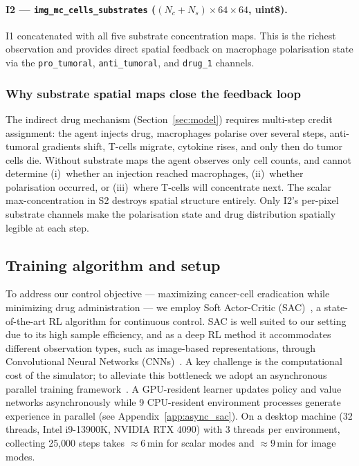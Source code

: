 \documentclass{article}
\newcommand{\Itwo}{\texttt{img\_mc\_cells\_substrates}}
\begin{document}
\paragraph{I2 — \Itwo{} ($(N_c\!+\!N_s)\!\times\!64\!\times\!64$, uint8).}
I1 concatenated with all five substrate concentration maps.
This is the richest observation and provides direct spatial feedback on
macrophage polarisation state via the \texttt{pro\_tumoral},
\texttt{anti\_tumoral}, and \texttt{drug\_1} channels.

\subsubsection*{Why substrate spatial maps close the feedback loop}

The indirect drug mechanism (Section~\ref{sec:model}) requires multi-step
credit assignment: the agent injects drug, macrophages polarise over several
steps, anti-tumoral gradients shift, T-cells migrate, cytokine rises, and
only then do tumor cells die.
Without substrate maps the agent observes only cell counts, and cannot
determine (i)~whether an injection reached macrophages, (ii)~whether
polarisation occurred, or (iii)~where T-cells will concentrate next.
The scalar max-concentration in S2 destroys spatial structure entirely.
Only I2's per-pixel substrate channels make the polarisation state and drug
distribution spatially legible at each step.

\subsection{Training algorithm and setup}
\label{sec:training}

To address our control objective — maximizing cancer-cell eradication while
minimizing drug administration — we employ Soft Actor-Critic
(SAC)~\citep{haarnoja2018soft}, a state-of-the-art RL algorithm for continuous
control. SAC is well suited to our setting due to its high sample efficiency,
and as a deep RL method it accommodates different observation types, such as
image-based representations, through Convolutional Neural Networks
(CNNs)~\citep{o2015introduction}. A key challenge is the computational cost of
the simulator; to alleviate this bottleneck we adopt an asynchronous parallel
training framework~\citep{mnih2016asynchronous, liu2025asynchronous}.
A GPU-resident learner updates policy and value networks asynchronously while
9 CPU-resident environment processes generate experience in parallel (see
Appendix~\ref{app:async_sac}).
On a desktop machine (32 threads, Intel i9-13900K, NVIDIA RTX 4090) with 3
threads per environment, collecting 25{,}000 steps takes $\approx6$\,min for
scalar modes and $\approx9$\,min for image modes.
\end{document}
